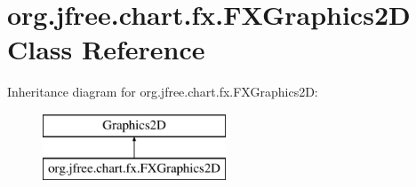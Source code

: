 \hypertarget{classorg_1_1jfree_1_1chart_1_1fx_1_1_f_x_graphics2_d}{}\section{org.\+jfree.\+chart.\+fx.\+F\+X\+Graphics2D Class Reference}
\label{classorg_1_1jfree_1_1chart_1_1fx_1_1_f_x_graphics2_d}
Inheritance diagram for org.\+jfree.\+chart.\+fx.\+F\+X\+Graphics2D\+:\begin{figure}[H]
\begin{center}
\leavevmode
\includegraphics[height=2.000000cm]{classorg_1_1jfree_1_1chart_1_1fx_1_1_f_x_graphics2_d}
\end{center}
\end{figure}
